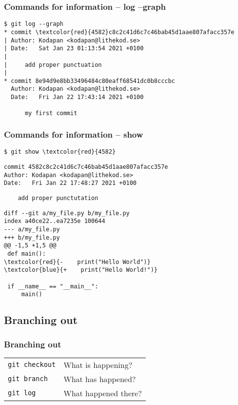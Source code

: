 \documentclass{beamer}
\begin{document}
\begin{frame}[fragile]
  \frametitle{Commands for information -- log --graph}
\begin{Verbatim}[commandchars=\\\{\}]
$ git log --graph
* commit \textcolor{red}{4582}c8c2c41d6c7c46bab45d1aae807afacc357e
| Author: Kodapan <kodapan@lithekod.se>
| Date:   Sat Jan 23 01:13:54 2021 +0100
| 
|     add proper punctuation
| 
* commit 8e94d9e8bb33496484c80eaff68541dc0b8cccbc
  Author: Kodapan <kodapan@lithekod.se>
  Date:   Fri Jan 22 17:43:14 2021 +0100
  
      my first commit
\end{Verbatim}
\end{frame}

\begin{frame}[fragile]
  \frametitle{Commands for information -- show}
\begin{Verbatim}[commandchars=\\\{\}]
$ git show \textcolor{red}{4582}
\end{Verbatim}
\pause{}
\vspace{-2.5ex}
\begin{verbatim}
commit 4582c8c2c41d6c7c46bab45d1aae807afacc357e
Author: Kodapan <kodapan@lithekod.se>
Date:   Fri Jan 22 17:48:27 2021 +0100
\end{verbatim}
\vspace{-3ex}
\begin{verbatim}
    add proper punctutation
\end{verbatim}
\vspace{-2ex}
\begin{Verbatim}[commandchars=\\\{\}]
diff --git a/my_file.py b/my_file.py
index a40ce22..ea7235e 100644
--- a/my_file.py
+++ b/my_file.py
@@ -1,5 +1,5 @@
 def main():
\textcolor{red}{-    print("Hello World")}
\textcolor{blue}{+    print("Hello World!")}
 
 if __name__ == "__main__":
     main()
\end{Verbatim}
\end{frame}

\subsection{Branching out}

\begin{frame}[fragile]
  \frametitle{Branching out}

  \begin{tabular}{ll}
    \texttt{git checkout} & What is happening? \\
    \texttt{git branch} & What has happened? \\
    \texttt{git log} & What happened there? \\
  \end{tabular}

\end{frame}
\end{document}
